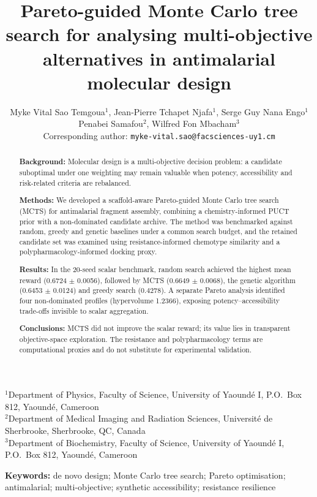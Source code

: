 \documentclass[10pt,a4paper]{article}
\title{\textbf{Pareto-guided Monte Carlo tree search for analysing multi-objective\\ alternatives in antimalarial molecular design}}
\author{%
  \begin{tabular}{c}
  Myke Vital Sao Temgoua$^{1}$, Jean-Pierre Tchapet Njafa$^{1}$, Serge Guy Nana Engo$^{1}$\\
  Penabei Samafou$^{2}$, Wilfred Fon Mbacham$^{3}$\\[0.2em]
  \small Corresponding author: \texttt{myke-vital.sao@facsciences-uy1.cm}
  \end{tabular}
}
\date{}
\begin{document}
\maketitle

\begin{center}
\begin{minipage}{0.92\textwidth}
\small\raggedright
$^{1}$Department of Physics, Faculty of Science, University of Yaound\'{e} I, P.O.\ Box 812, Yaound\'{e}, Cameroon\\
$^{2}$Department of Medical Imaging and Radiation Sciences, Universit\'{e} de Sherbrooke, Sherbrooke, QC, Canada\\
$^{3}$Department of Biochemistry, Faculty of Science, University of Yaound\'{e} I, P.O.\ Box 812, Yaound\'{e}, Cameroon
\end{minipage}
\end{center}

\begin{abstract}
\noindent
\textbf{Background:} Molecular design is a multi-objective decision problem: a candidate suboptimal under one weighting may remain valuable when potency, accessibility and risk-related criteria are rebalanced.\par
\textbf{Methods:} We developed a scaffold-aware Pareto-guided Monte Carlo tree search (MCTS) for antimalarial fragment assembly, combining a chemistry-informed PUCT prior with a non-dominated candidate archive. The method was benchmarked against random, greedy and genetic baselines under a common search budget, and the retained candidate set was examined using resistance-informed chemotype similarity and a polypharmacology-informed docking proxy.\par
\textbf{Results:} In the \num{20}-seed scalar benchmark, random search achieved the highest mean reward (\num{0.6724} $\pm$ \num{0.0056}), followed by MCTS (\num{0.6649} $\pm$ \num{0.0068}), the genetic algorithm (\num{0.6453} $\pm$ \num{0.0124}) and greedy search (\num{0.4278}). A separate Pareto analysis identified four non-dominated profiles (hypervolume \num{1.2366}), exposing potency--accessibility trade-offs invisible to scalar aggregation.\par
\textbf{Conclusions:} MCTS did not improve the scalar reward; its value lies in transparent objective-space exploration. The resistance and polypharmacology terms are computational proxies and do not substitute for experimental validation.
\end{abstract}

\noindent\textbf{Keywords:} de novo design; Monte Carlo tree search; Pareto optimisation; antimalarial; multi-objective; synthetic accessibility; resistance resilience
\end{document}
